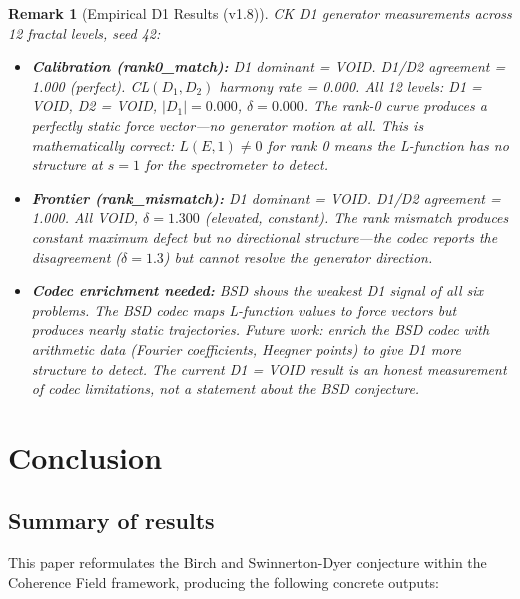 \documentclass[11pt]{article}
\newtheorem{remark}[theorem]{Remark}
\begin{document}
\begin{remark}[Empirical D1 Results (v1.8)]
CK D1 generator measurements across 12 fractal levels, seed 42:
\begin{itemize}[nosep]
  \item \textbf{Calibration (rank0\_match):} D1 dominant = VOID. D1/D2 agreement = 1.000 (perfect). CL$(D_1,D_2)$ harmony rate = 0.000. All 12 levels: D1 = VOID, D2 = VOID, $|D_1| = 0.000$, $\delta = 0.000$. The rank-0 curve produces a perfectly static force vector---no generator motion at all. This is mathematically correct: $L(E, 1) \neq 0$ for rank 0 means the L-function has no structure at $s=1$ for the spectrometer to detect.
  \item \textbf{Frontier (rank\_mismatch):} D1 dominant = VOID. D1/D2 agreement = 1.000. All VOID, $\delta = 1.300$ (elevated, constant). The rank mismatch produces constant maximum defect but no directional structure---the codec reports the disagreement ($\delta = 1.3$) but cannot resolve the generator direction.
  \item \textbf{Codec enrichment needed:} BSD shows the weakest D1 signal of all six problems. The BSD codec maps L-function values to force vectors but produces nearly static trajectories. Future work: enrich the BSD codec with arithmetic data (Fourier coefficients, Heegner points) to give D1 more structure to detect. The current D1 = VOID result is an honest measurement of codec limitations, not a statement about the BSD conjecture.
\end{itemize}
\end{remark}

\section{Conclusion}
\label{sec:conclusion}

\subsection{Summary of results}

This paper reformulates the Birch and Swinnerton-Dyer conjecture within the
Coherence Field framework, producing the following concrete outputs:
\end{document}
